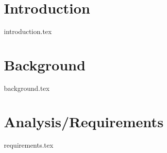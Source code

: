 \documentclass{l4proj}
\begin{document}
\tableofcontents
\newpage
\listoffigures

%
%
%
%
%
%
%
%
\chapter{Introduction}

{introduction.tex}

\chapter{Background}\label{bg}
{background.tex}

\chapter{Analysis/Requirements}\label{anReq}
{requirements.tex}
\end{document}
